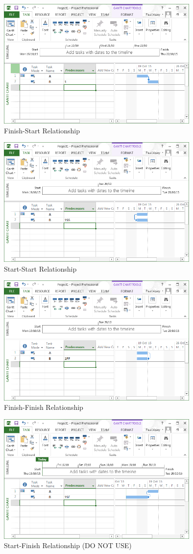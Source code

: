 \begin{figure}
	\centering
		\includegraphics[width=10cm]{img/FS.PNG}
	\caption{Finish-Start Relationship}
	\label{fig:FS}
\end{figure}

\begin{figure}
	\centering
		\includegraphics[width=10cm]{img/SS.PNG}
	\caption{Start-Start Relationship}
	\label{fig:SS}
\end{figure}

\begin{figure}
	\centering
		\includegraphics[width=10cm]{img/FF.PNG}
	\caption{Finish-Finish Relationship}
	\label{fig:FF}
\end{figure}

\begin{figure}
	\centering
		\includegraphics[width=10cm]{img/SF.PNG}
	\caption{Start-Finish Relationship (DO NOT USE)}
	\label{fig:SFl}
\end{figure}



